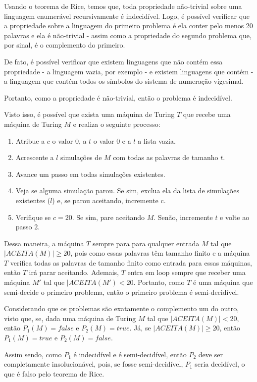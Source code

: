 \documentclass{article}
\begin{document}
  {
  \color{blue}
    \par Usando o teorema de Rice, temos que, toda propriedade não-trivial sobre uma linguagem enumerável recursivamente é indecidível. Logo, é possível verificar que a propriedade sobre a linguagem do primeiro problema é ela conter pelo menos 20 palavras e ela é não-trivial - assim como a propriedade do segundo problema que, por sinal, é o complemento do primeiro.
    \par De fato, é possível verificar que existem linguagens que não contém essa propriedade - a linguagem vazia, por exemplo - e existem linguagens que contém - a linguagem que contém todos os símbolos do sistema de numeração vigesimal.
    \par Portanto, como a propriedade é não-trivial, então o problema é indecidível.
    \par Visto isso, é possível que exista uma máquina de Turing $T$ que recebe uma máquina de Turing $M$ e realiza o seguinte processo:
    \begin{enumerate}
      \item Atribue a $c$ o valor $0$, a $t$ o valor $0$ e a $l$ a lista vazia.
      \item Acrescente a $l$ simulações de $M$ com todas as palavras de tamanho $t$.
      \item Avance um passo em todas simulações existentes.
      \item Veja se alguma simulação parou. Se sim, exclua ela da lista de simulações existentes ($l$) e, se parou aceitando, incremente c.
      \item Verifique se $c = 20$. Se sim, pare aceitando $M$. Senão, incremente $t$ e volte ao passo 2.
    \end{enumerate}
    \par Dessa maneira, a máquina $T$ sempre para para qualquer entrada $M$ tal que $|ACEITA(M)| \geq 20$, pois como essas palavras têm tamanho finito e a máquina $T$ verifica todas as palavras de tamanho finito como entrada para essas máquinas, então $T$ irá parar aceitando. Ademais, $T$ entra em loop sempre que receber uma máquina $M'$ tal que $|ACEITA(M') < 20$. Portanto, como $T$ é uma máquina que semi-decide o primeiro problema, então o primeiro problema é semi-decidível.
    \par Considerando que os problemas são exatamente o complemento um do outro, visto que, se, dada uma máquina de Turing $M$ tal que $|ACEITA(M)| < 20$, então $P_1(M) = false$ e $P_2(M) = true$. Já, se $|ACEITA(M)| \geq 20$, então $P_1(M) = true$ e $P_2(M) = false$.
    \par Assim sendo, como $P_1$ é indecidível e é semi-decidível, então $P_2$ deve ser completamente insolucionável, pois, se fosse semi-decidível, $P_1$ seria decidível, o que é falso pelo teorema de Rice.
  }
\end{document}
